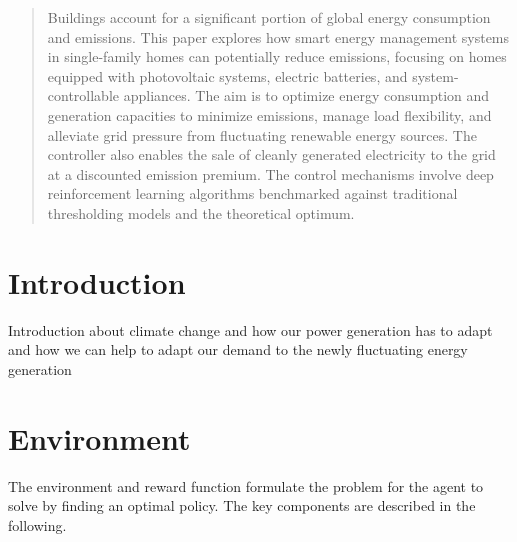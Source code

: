 \documentclass{article}
\theoremstyle{plain}
\theoremstyle{definition}
\theoremstyle{remark}
\begin{document}
\printAffiliationsAndNotice{\icmlEqualContribution} 

\begin{abstract}
    Buildings account for a significant portion of global energy consumption and emissions. This paper explores how smart energy management systems in single-family homes can potentially reduce emissions, focusing on homes equipped with photovoltaic systems, electric batteries, and system-controllable appliances. The aim is to optimize energy consumption and generation capacities to minimize emissions, manage load flexibility, and alleviate grid pressure from fluctuating renewable energy sources. The controller also enables the sale of cleanly generated electricity to the grid at a discounted emission premium. The control mechanisms involve deep reinforcement learning algorithms benchmarked against traditional thresholding models and the theoretical optimum.
\end{abstract}

\section{Introduction}
\label{introduction}

Introduction about climate change and how our power generation has to adapt and how we can help to adapt our demand to the newly fluctuating energy generation

\section{Environment}
\label{enviroment}

The environment and reward function formulate the problem for the agent to solve by finding an optimal policy. The key components are described in the following.
\end{document}
